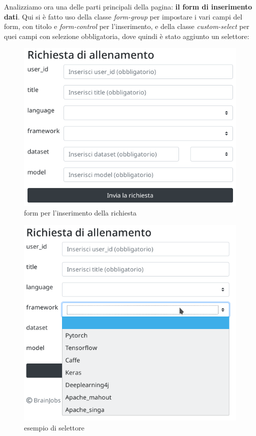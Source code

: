 \documentclass[a4paper,12pt, oneside]{book}
\begin{document}
Analizziamo ora una delle parti principali della pagina: \textbf{il form di inserimento dati}. Qui si è fatto uso della classe \textit{form-group} per impostare i
vari campi del form, con titolo e \textit{form-control} per l'inserimento, e della
classe \textit{custom-select} per quei campi con selezione obbligatoria,
dove quindi è stato aggiunto un selettore:
\begin{figure}[H]
  \centering
  \includegraphics[scale = 0.7]{img/form.png}
  \caption{form per l'inserimento della richiesta}
\end{figure}
\begin{figure}[H]
  \centering
  \includegraphics[scale = 0.7]{img/selettore.png}
  \caption{esempio di selettore}
\end{figure}
\end{document}
